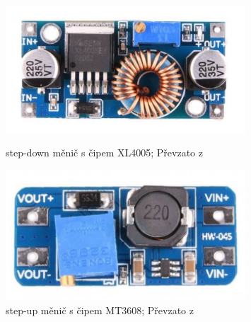 \begin{figure}[htb]
  \centering
  \begin{minipage}{0.45\textwidth}
    \centering
  \includegraphics[width=0.8\textwidth]{img/XL4005.jpg}
  \caption{\label{fig:XL4005} step-down měnič s čipem XL4005; Převzato z~\cite{laskakit-XL4005}}
  \end{minipage}\hfill
  \begin{minipage}{0.45\textwidth}
    \centering
  \includegraphics[width=0.8\textwidth]{img/MT3608.jpg}
  \caption{\label{fig:MT3608} step-up měnič s čipem MT3608; Převzato z~\cite{laskakit-MT3608}}
  \end{minipage}
\end{figure}
